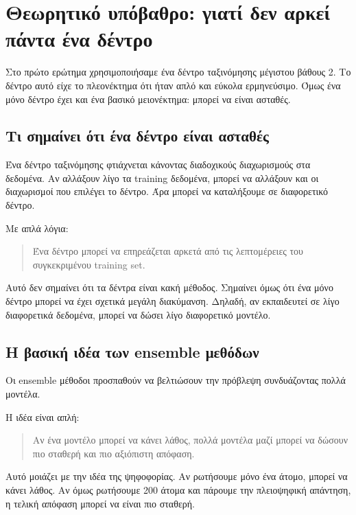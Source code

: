 \documentclass[12pt,a4paper]{article}
\begin{document}
\section{Θεωρητικό υπόβαθρο: γιατί δεν αρκεί πάντα ένα δέντρο}

Στο πρώτο ερώτημα χρησιμοποιήσαμε ένα δέντρο ταξινόμησης μέγιστου βάθους 2.
Το δέντρο αυτό είχε το πλεονέκτημα ότι ήταν απλό και εύκολα ερμηνεύσιμο.
Όμως ένα μόνο δέντρο έχει και ένα βασικό μειονέκτημα: μπορεί να είναι
ασταθές.

\subsection{Τι σημαίνει ότι ένα δέντρο είναι ασταθές}

Ένα δέντρο ταξινόμησης φτιάχνεται κάνοντας διαδοχικούς διαχωρισμούς στα
δεδομένα. Αν αλλάξουν λίγο τα training δεδομένα, μπορεί να αλλάξουν και οι
διαχωρισμοί που επιλέγει το δέντρο. Άρα μπορεί να καταλήξουμε σε διαφορετικό
δέντρο.

Με απλά λόγια:

\begin{quote}
Ένα δέντρο μπορεί να επηρεάζεται αρκετά από τις λεπτομέρειες του συγκεκριμένου
training set.
\end{quote}

Αυτό δεν σημαίνει ότι τα δέντρα είναι κακή μέθοδος. Σημαίνει όμως ότι ένα μόνο
δέντρο μπορεί να έχει σχετικά μεγάλη διακύμανση. Δηλαδή, αν εκπαιδευτεί σε
λίγο διαφορετικά δεδομένα, μπορεί να δώσει λίγο διαφορετικό μοντέλο.

\subsection{Η βασική ιδέα των ensemble μεθόδων}

Οι ensemble μέθοδοι προσπαθούν να βελτιώσουν την πρόβλεψη συνδυάζοντας πολλά
μοντέλα.

Η ιδέα είναι απλή:

\begin{quote}
Αν ένα μοντέλο μπορεί να κάνει λάθος, πολλά μοντέλα μαζί μπορεί να δώσουν πιο
σταθερή και πιο αξιόπιστη απόφαση.
\end{quote}

Αυτό μοιάζει με την ιδέα της ψηφοφορίας. Αν ρωτήσουμε μόνο ένα άτομο, μπορεί
να κάνει λάθος. Αν όμως ρωτήσουμε 200 άτομα και πάρουμε την πλειοψηφική
απάντηση, η τελική απόφαση μπορεί να είναι πιο σταθερή.
\end{document}
